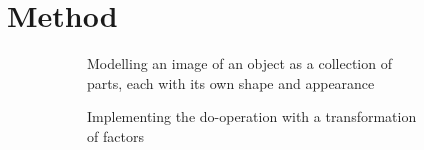 \chapter{Method}

	\begin{figure}[t]
		\begin{subfigure}{0.49\linewidth}
			\centering
			
			\caption{Modelling an image of an object as a collection of parts, each with its own shape and appearance}
			\label{fig:s1}
		\end{subfigure}
		\begin{subfigure}{0.49\linewidth}
			\centering
			
			\caption{Implementing the do-operation with a transformation of factors}
			\label{fig:s2}
		\end{subfigure}
		\caption{}
		\label{fig:fig}
	\end{figure}

